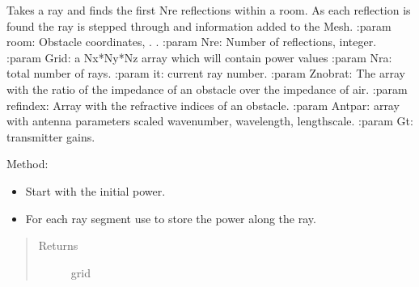 \documentclass[letterpaper,10pt,english]{sphinxmanual}
\begin{document}
\begin{fulllineitems}
\begin{fulllineitems}
\begin{quote}
\begin{description}
\end{description}\end{quote}

\end{fulllineitems}


\begin{fulllineitems}
\label{\detokenize{index:Rays.Ray.mesh_power_multiref}}
Takes a ray and finds the first Nre reflections within a room.
As each reflection is found the ray is stepped through and
information added to the Mesh.
:param room: Obstacle co\sphinxhyphen{}ordinates, {\hyperref[\detokenize{index:module-Room}]{}}. .
:param Nre: Number of reflections, integer.
:param Grid: a Nx*Ny*Nz array which will contain power values
:param Nra: total number of rays.
:param it: current ray number.
:param Znobrat: The array with the ratio of the impedance of an     obstacle over the impedance of air.
:param refindex: Array with the refractive indices of an obstacle.
:param Antpar: array with antenna parameters \sphinxhyphen{} scaled wavenumber, wavelength, lengthscale.
:param Gt: transmitter gains.

Method:
\begin{itemize}
\item {} 
Start with the initial power.

\item {} 
For each ray segment use      to      store the power along the ray.

\end{itemize}
\begin{quote}\begin{description}
\item[{Returns}] \leavevmode
grid

\end{description}\end{quote}

\end{fulllineitems}



\end{fulllineitems}
\end{document}
